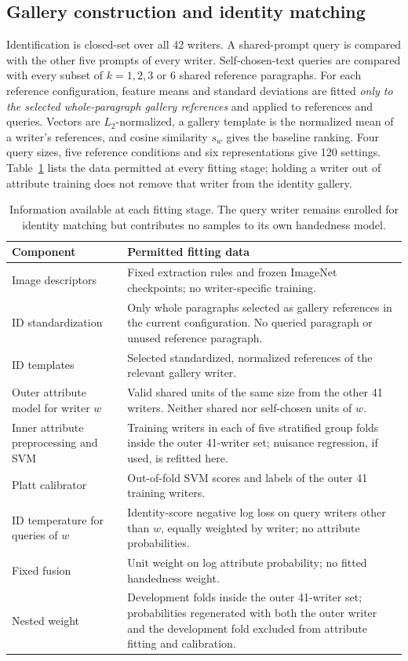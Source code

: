 \documentclass[ASNA,twocolumn]{USG}
\begin{document}
\subsection{Gallery construction and identity matching}
Identification is closed-set over all 42 writers. A shared-prompt query is compared with the other five prompts of every writer. Self-chosen-text queries are compared with every subset of $k=1,2,3$ or 6 shared reference paragraphs. For each reference configuration, feature means and standard deviations are fitted \emph{only to the selected whole-paragraph gallery references} and applied to references and queries. Vectors are $L_2$-normalized, a gallery template is the normalized mean of a writer's references, and cosine similarity $s_w$ gives the baseline ranking. Four query sizes, five reference conditions and six representations give 120 settings. Table~\ref{tab:mainnesting} lists the data permitted at every fitting stage; holding a writer out of attribute training does not remove that writer from the identity gallery.

\begin{table}[!t]
\caption{Information available at each fitting stage. The query writer remains enrolled for identity matching but contributes no samples to its own handedness model.}\label{tab:mainnesting}
\centering\small
\begin{tabularx}{\textwidth}{>{\raggedright\arraybackslash}p{}>{\raggedright\arraybackslash}X}\toprule
Component & Permitted fitting data\\\midrule
Image descriptors & Fixed extraction rules and frozen ImageNet checkpoints; no writer-specific training.\\
ID standardization & Only whole paragraphs selected as gallery references in the current configuration. No queried paragraph or unused reference paragraph.\\
ID templates & Selected standardized, normalized references of the relevant gallery writer.\\
Outer attribute model for writer $w$ & Valid shared units of the same size from the other 41 writers. Neither shared nor self-chosen units of $w$.\\
Inner attribute preprocessing and SVM & Training writers in each of five stratified group folds inside the outer 41-writer set; nuisance regression, if used, is refitted here.\\
Platt calibrator & Out-of-fold SVM scores and labels of the outer 41 training writers.\\
ID temperature for queries of $w$ & Identity-score negative log loss on query writers other than $w$, equally weighted by writer; no attribute probabilities.\\
Fixed fusion & Unit weight on log attribute probability; no fitted handedness weight.\\
Nested weight & Development folds inside the outer 41-writer set; probabilities regenerated with both the outer writer and the development fold excluded from attribute fitting and calibration.\\\bottomrule
\end{tabularx}
\end{table}
\end{document}
